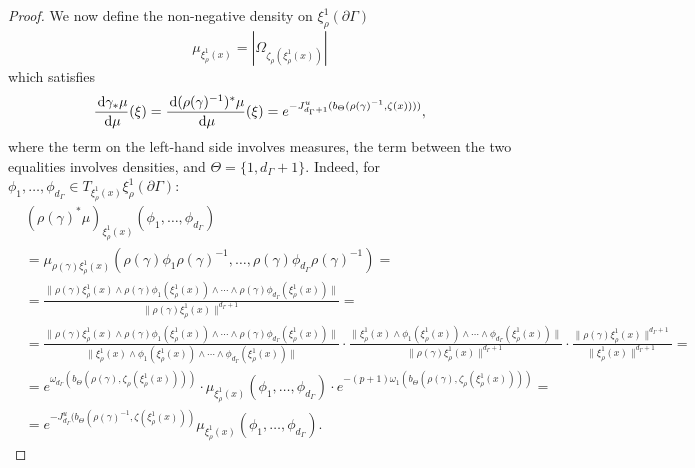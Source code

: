 \documentclass{report}
\begin{document}
\begin{proof}
    We now define the non-negative density on $\xi_\rho^1(\partial \Gamma)$
    \[
        \mu_{\xi_\rho^1(x)} = |\Omega_{\zeta_\rho(\xi_\rho^1(x))}|
    \]
    which satisfies
    \[
        \frac{\,\mathrm{d} \gamma_*\mu}{\,\mathrm{d}\mu}(\xi) = \frac{\,\mathrm{d} (\rho(\gamma)^{-1})^*\mu}{\,\mathrm{d}\mu}(\xi) =
        e^{-J^u_{d_\Gamma + 1}(b_\Theta(\rho(\gamma)^{-1}, \zeta(x))))},
    \]
    where the term on the left-hand side involves measures, the term between the two equalities involves densities, and $\Theta = \{1, d_\Gamma + 1\}$.
    Indeed, for $\phi_1, \ldots, \phi_{d_\Gamma} \in T_{\xi_\rho^1(x)}\xi_\rho^1(\partial \Gamma)$:
    \begin{align*}
        &(\rho(\gamma)^*\mu)_{\xi_\rho^1(x)} (\phi_1, \ldots, \phi_{d_\Gamma})\\
        &=
        \mu_{\rho(\gamma)\xi_\rho^1(x)} (\rho(\gamma)\phi_1\rho(\gamma)^{-1}, \ldots, \rho(\gamma)\phi_{d_\Gamma} \rho(\gamma)^{-1}) =\\
        &=
        \frac{\|\rho(\gamma) \xi_\rho^1(x) \wedge \rho(\gamma) \phi_1(\xi_\rho^1(x)) \wedge \cdots \wedge \rho(\gamma) \phi_{d_\Gamma}(\xi_\rho^1(x))\|}{\| \rho(\gamma) \xi_\rho^1(x) \|^{d_\Gamma + 1}} =\\
        &=
        \frac{\|\rho(\gamma) \xi_\rho^1(x) \wedge \rho(\gamma) \phi_1(\xi_\rho^1(x)) \wedge \cdots \wedge \rho(\gamma) \phi_{d_\Gamma}(\xi_\rho^1(x))\|}
        {\|\xi_\rho^1(x) \wedge \phi_1(\xi_\rho^1(x)) \wedge \cdots \wedge \phi_{d_\Gamma}(\xi_\rho^1(x))\|} \cdot
        \frac{\|\xi_\rho^1(x) \wedge \phi_1(\xi_\rho^1(x)) \wedge \cdots \wedge \phi_{d_\Gamma}(\xi_\rho^1(x))\|}
        {\|\rho(\gamma) \xi_\rho^1(x)\|^{d_\Gamma+1}}\cdot
        \frac{\| \rho(\gamma)\xi_\rho^1(x)\|^{d_\Gamma+1}}{\|\xi_\rho^1(x)\|^{d_\Gamma+1}}
         =\\
         &=
         e^{\omega_{d_\Gamma}(b_\Theta(\rho(\gamma), \zeta_\rho(\xi_\rho^1(x))))} \cdot
         \mu_{\xi_\rho^1(x)}(\phi_1, \ldots, \phi_{d_\Gamma}) \cdot
         e^{-(p+1)\omega_1(b_\Theta(\rho(\gamma), \zeta_\rho(\xi_\rho^1(x))))} =\\
         &=
         e^{-J_{d_\Gamma}^u(b_\Theta(\rho(\gamma)^{-1}, \zeta(\xi_\rho^1(x)))} \mu_{\xi_\rho^1(x)}(\phi_1, \ldots, \phi_{d_\Gamma}).
    \end{align*}
    

\end{proof}
\end{document}
